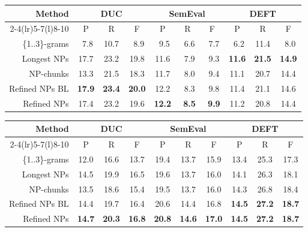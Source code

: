       \begin{table*}
        \centering
        \begin{tabular}{@{}rccccccccc@{}}
          \toprule
          \multirow{2}{*}[-2pt]{\textbf{Method}} & \multicolumn{3}{c}{\textbf{DUC}} & \multicolumn{3}{c}{\textbf{SemEval}} & \multicolumn{3}{c}{\textbf{DEFT}}\\
          \cmidrule(r){2-4}\cmidrule(lr){5-7}\cmidrule(l){8-10}
          & P & R & F & P & R & F & P & R & F\\
          \midrule
          \{1..3\}-grams & $~~$7.8 & 10.7 & $~~$8.9 & $~~$9.5 & $~~$6.6 & $~~$7.7 & $~~$6.2 & 11.4 & $~~$8.0\\
          Longest NPs & 17.7 & 23.2 & 19.8 & 11.6 & $~~$7.9 & $~~$9.3 & \textbf{11.6} & \textbf{21.5} & \textbf{14.9}\\
          NP-chunks & 13.3 & 21.5 & 18.3 & 11.7 & $~~$8.0 & $~~$9.4 & 11.1 & 20.7 & 14.4\\
          Refined NPs BL & \textbf{17.9} & \textbf{23.4} & \textbf{20.0} & 12.2 & $~~$8.3 & $~~$9.8 & 11.4 & 21.1 & 14.6\\
          Refined NPs & 17.4 & 23.2 & 19.6 & \textbf{12.2} & \textbf{$~~$8.5} & \textbf{$~~$9.9} & 11.2 & 20.8 & 14.4\\
          \bottomrule
        \end{tabular}
        \caption{Comparison of candidate selection methods, when 10 keyphrases
                 are extracted by \textbf{TopicRank}.
                 \label{tab:topicrank_results}}
      \end{table*}
      \begin{table*}
        \centering
        \begin{tabular}{@{}rccccccccc@{}}
          \toprule
          \multirow{2}{*}[-2pt]{\textbf{Method}} & \multicolumn{3}{c}{\textbf{DUC}} & \multicolumn{3}{c}{\textbf{SemEval}} & \multicolumn{3}{c}{\textbf{DEFT}}\\
          \cmidrule(r){2-4}\cmidrule(lr){5-7}\cmidrule(l){8-10}
          & P & R & F & P & R & F & P & R & F\\
          \midrule
          \{1..3\}-grams & 12.0 & 16.6 & 13.7 & 19.4 & 13.7 & 15.9 & 13.4 & 25.3 & 17.3\\
          Longest NPs & 14.5 & 19.9 & 16.5 & 19.6 & 13.7 & 16.0 & 14.1 & 26.3 & 18.1\\
          NP-chunks & 13.5 & 18.6 & 15.4 & 19.5 & 13.7 & 16.0 & 14.3 & 26.8 & 18.4\\
          Refined NPs BL & 14.4 & 19.7 & 16.4 & 20.6 & 14.4 & 16.8 & \textbf{14.5} & \textbf{27.2} & \textbf{18.7}\\
          Refined NPs & \textbf{14.7} & \textbf{20.3} & \textbf{16.8} & \textbf{20.8} & \textbf{14.6} & \textbf{17.0}& \textbf{14.5} & \textbf{27.2} & \textbf{18.7}\\
          \bottomrule
        \end{tabular}
        \caption{Comparison of candidate selection methods, when 10 keyphrases
                 are extracted by \textbf{KEA}.
                 \label{tab:kea_results}}
      \end{table*}
